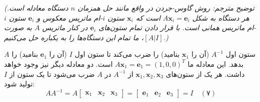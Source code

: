 \documentclass[12pt, a4paper]{book}
\begin{document}
	\textit{(توضیح مترجم: روش گاوس-جردن در واقع مانند حل همزمان $n$ دستگاه معادله است. هر دستگاه به شکل $A\mathbf{x}_i=\mathbf{e}_i$ است که $\mathbf{x}_i$ ستون $i$-ام ماتریس معکوس و $\mathbf{e}_i$ ستون $i$-ام ماتریس همانی است. با قرار دادن تمام ستون‌های $\mathbf{e}_i$ در کنار ماتریس $A$ به صورت $[A|I]$، ما تمام این دستگاه‌ها را به یکباره حل می‌کنیم.)}
	
	$A$ ستون اول $A^{-1}$ (آن را $\mathbf{x}_1$ بنامید) را ضرب می‌کند تا ستون اول $I$ (آن را $\mathbf{e}_1$ بنامید) را بدهد. این معادله ما $A\mathbf{x}_1=\mathbf{e}_1=(1,0,0)^T$ است. دو معادله دیگر نیز وجود خواهد داشت. هر یک از ستون‌های $\mathbf{x}_1, \mathbf{x}_2, \mathbf{x}_3$ از $A^{-1}$ در $A$ ضرب می‌شود تا یک ستون از $I$ تولید شود:
	\[ A A^{-1} = A \begin{bmatrix} \mathbf{x}_1 & \mathbf{x}_2 & \mathbf{x}_3 \end{bmatrix} = \begin{bmatrix} \mathbf{e}_1 & \mathbf{e}_2 & \mathbf{e}_3 \end{bmatrix} = I \quad (۷) \]
	
\end{document}
